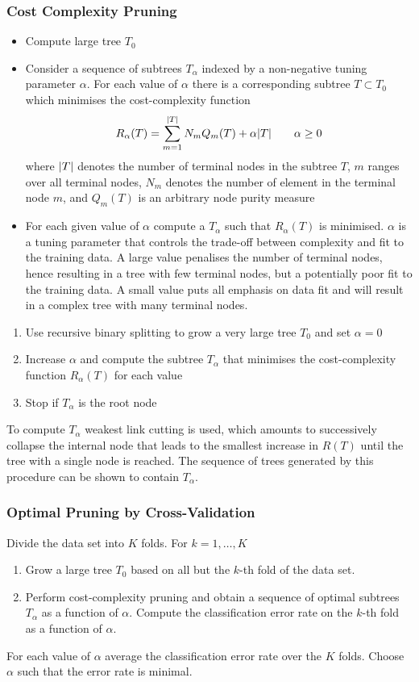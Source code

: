 \documentclass[11pt]{article}
\DeclarePairedDelimiter\abs{\lvert}{\rvert}
\begin{document}
\subsubsection{Cost Complexity Pruning}
\begin{itemize}
	\item Compute large tree $T_0$
	\item Consider a sequence of subtrees $T_\alpha$ indexed by a non-negative tuning parameter $\alpha$. For each value of $\alpha$ there is a corresponding subtree $T\subset T_0$ which minimises the cost-complexity function
	\begin{equation*}
		R_{\alpha}(T) = \sum_{m=1}^{\abs{T}} N_m Q_m (T) + \alpha\abs{T}\qquad \alpha\geq 0
	\end{equation*}
	where $\abs{T}$ denotes the number of terminal nodes in the subtree $T$, $m$ ranges over all terminal nodes, $N_m$ denotes the number of element in the terminal node $m$, and $Q_m(T)$ is an arbitrary node purity measure
	\item For each given value of $\alpha$ compute a $T_\alpha$ such that $R_{\alpha}(T)$ is minimised. $\alpha$ is a tuning parameter that controls the trade-off between complexity and fit to the training data. A large value penalises the number of terminal nodes, hence resulting in a tree with few terminal nodes, but a potentially poor fit to the training data. A small value puts all emphasis on data fit and will result in a complex tree with many terminal nodes.
\end{itemize}
\begin{enumerate}
	\item Use recursive binary splitting to grow a very large tree $T_0$ and set $\alpha = 0$
	\item Increase $\alpha$ and compute the subtree $T_\alpha$ that minimises the cost-complexity function $R_\alpha(T)$ for each value
	\item Stop if $T_\alpha$ is the root node
\end{enumerate}
To compute $T_\alpha$ weakest link cutting is used, which amounts to successively collapse the internal node that leads to the smallest increase in $R(T)$ until the tree with a single node is reached. The sequence of trees generated by this procedure can be shown to contain $T_\alpha$.

\subsubsection{Optimal Pruning by Cross-Validation}
Divide the data set into $K$ folds. For $k = 1,\dots,K$
\begin{enumerate}
	\item Grow a large tree $T_0$ based on all but the $k$-th fold of the data set.
	\item Perform cost-complexity pruning and obtain a sequence of optimal subtrees $T_\alpha$ as a function of $\alpha$. Compute the classification error rate on the $k$-th fold as a function of $\alpha$.
\end{enumerate}
For each value of $\alpha$ average the classification error rate over the $K$ folds. Choose $\alpha$ such that the error rate is minimal.
\end{document}
